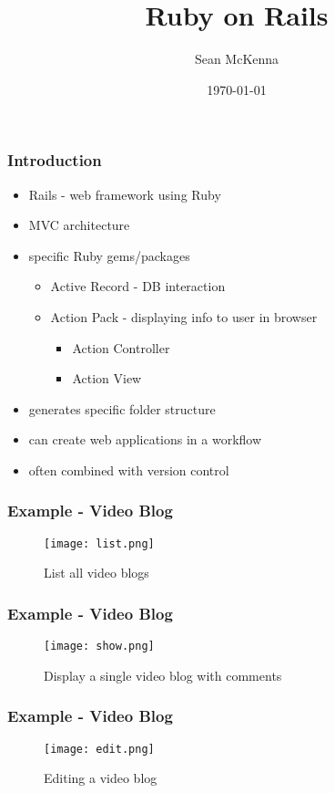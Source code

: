 \documentclass{beamer}
\title{Ruby on Rails}
\author{Sean McKenna}
\institute[Cornell College]{ Cornell College \\ \medskip {\emph{smckenna12@cornellcollege.edu}} }
\date{\today}
\begin{document}
\begin{frame}
  \titlepage
\end{frame}

\begin{frame}
  \frametitle{Introduction}
  \begin{itemize}
    \item Rails - web framework using Ruby \medskip
    \item MVC architecture \medskip
    \item specific Ruby gems/packages
    \begin{itemize}
      \item Active Record - DB interaction
      \item Action Pack - displaying info to user in browser
      \begin{itemize}
        \item Action Controller
        \item Action View
      \end{itemize}
    \end{itemize} \medskip
    \item generates specific folder structure \medskip
    \item can create web applications in a workflow \medskip
    \item often combined with version control
  \end{itemize}
\end{frame}

\begin{frame}
  \frametitle{Example - Video Blog}
  \begin{figure}
    \texttt{[image: list.png]}
    \caption{List all video blogs}
  \end{figure}
\end{frame}

\begin{frame}
  \frametitle{Example - Video Blog}
  \begin{figure}
    \texttt{[image: show.png]}
    \caption{Display a single video blog with comments}
  \end{figure}
\end{frame}

\begin{frame}
  \frametitle{Example - Video Blog}
  \begin{figure}
    \texttt{[image: edit.png]}
    \caption{Editing a video blog}
  \end{figure}
\end{frame}
\end{document}
